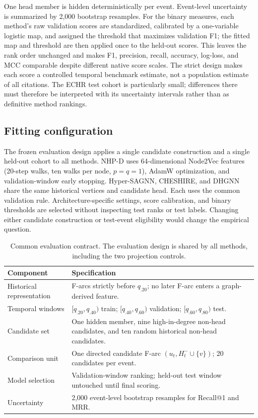 \documentclass{svproc}
\begin{document}
One head member is hidden deterministically per event. Event-level uncertainty is summarized by 2,000 bootstrap resamples. For the binary measures, each method's raw validation scores are standardized, calibrated by a one-variable logistic map, and assigned the threshold that maximizes validation F1; the fitted map and threshold are then applied once to the held-out scores. This leaves the rank order unchanged and makes F1, precision, recall, accuracy, log-loss, and MCC comparable despite different native score scales. The strict design makes each score a controlled temporal benchmark estimate, not a population estimate of all citations. The ECHR test cohort is particularly small; differences there must therefore be interpreted with its uncertainty intervals rather than as definitive method rankings.

\subsection{Fitting configuration}

The frozen evaluation design applies a single candidate construction and a single held-out cohort to all methods. NHP-D uses 64-dimensional Node2Vec features (20-step walks, ten walks per node, $p=q=1$), AdamW optimization, and validation-window early stopping. Hyper-SAGNN, CHESHIRE, and DHGNN share the same historical vertices and candidate head. Each uses the common validation rule. Architecture-specific settings, score calibration, and binary thresholds are selected without inspecting test ranks or test labels. Changing either candidate construction or test-event eligibility would change the empirical question.

\begin{table}[t]
\caption{Common evaluation contract. The evaluation design is shared by all methods, including the two projection controls.}
\label{tab:configuration}
\centering
\footnotesize
\setlength{\tabcolsep}{3pt}
\begin{tabular}{@{}p{}p{}@{}}
\toprule
Component & Specification\\
\midrule
Historical representation & F-arcs strictly before $q_{.20}$; no later F-arc enters a graph-derived feature.\\
Temporal windows & $[q_{.20},q_{.40})$ train; $[q_{.40},q_{.60})$ validation; $[q_{.60},q_{.80})$ test.\\
Candidate set & One hidden member, nine high-in-degree non-head candidates, and ten random historical non-head candidates.\\
Comparison unit & One directed candidate F-arc $(u_t,H_t^-\cup\{v\})$; 20 candidates per event.\\
Model selection & Validation-window ranking; held-out test window untouched until final scoring.\\
Uncertainty & 2,000 event-level bootstrap resamples for Recall@1 and MRR.\\
\bottomrule
\end{tabular}
\end{table}
\end{document}
